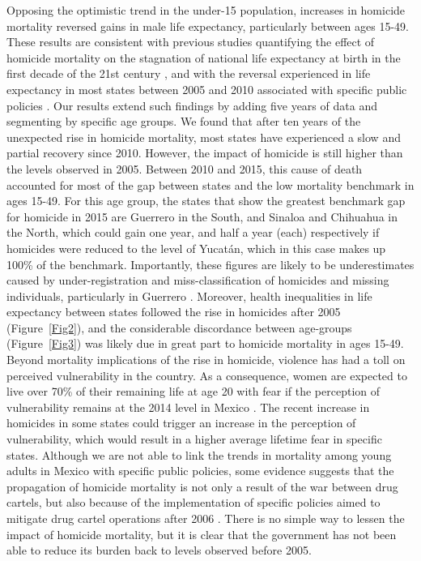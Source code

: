 \documentclass{bmcart}
\begin{document}
Opposing the optimistic trend in the under-15 population, increases in homicide mortality reversed gains in male life expectancy, particularly between ages 15-49. These results are consistent with previous studies quantifying the effect of homicide mortality on the stagnation of national life expectancy at birth in the first decade of the 21st century \cite{canudas2014}, and with the reversal experienced in life expectancy in most states between 2005 and 2010 associated with specific public policies \cite{Aburto2015}. Our results extend such findings by adding five years of data and segmenting by specific age groups. We found that after ten years of the unexpected rise in homicide mortality, most states have experienced a slow and partial recovery since 2010. However, the impact of homicide is still higher than the levels observed in 2005. Between 2010 and 2015, this cause of death accounted for most of the gap between states and the low mortality benchmark in ages 15-49. For this age group, the states that show the greatest benchmark gap for homicide in 2015 are Guerrero in the South, and Sinaloa and Chihuahua in the North, which could gain one year, and half a year (each) respectively if homicides were reduced to the level of Yucat\'an, which in this case makes up 100\% of the benchmark. Importantly, these figures are likely to be underestimates caused by under-registration and miss-classification of homicides and missing individuals, particularly in Guerrero \cite{HRW2011,wright2017epistemological}. Moreover, health inequalities in life expectancy between states followed the rise in homicides after 2005 (Figure~\ref{Fig2}), and the considerable discordance between age-groups (Figure~\ref{Fig3}) was likely due in great part to homicide mortality in ages 15-49.
Beyond mortality implications of the rise in homicide, violence has had a toll on perceived vulnerability in the country. As a consequence, women are expected to live over 70\% of their remaining life at age 20 with fear if the perception of vulnerability remains at the 2014 level in Mexico \cite{canudas2017Mexico}. The recent increase in homicides in some states could trigger an increase in the perception of vulnerability, which would result in a higher average lifetime fear in specific states. Although we are not able to link the trends in mortality among young adults in Mexico with specific public policies, some evidence suggests that the propagation of homicide mortality is not only a result of the war between drug cartels, but also because of the implementation of specific policies aimed to mitigate drug cartel operations after 2006 \cite{espinal2015analysis}.
There is no simple way to lessen the impact of homicide mortality, but it is clear that the government has not been able to reduce its burden back to levels observed before 2005.
\end{document}
